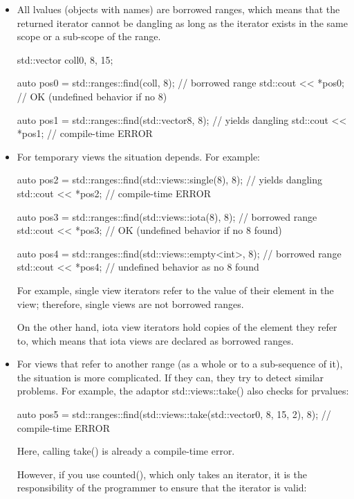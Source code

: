 \begin{itemize}
\item
All lvalues (objects with names) are borrowed ranges, which means that the returned iterator cannot be dangling as long as the iterator exists in the same scope or a sub-scope of the range.

\begin{cpp}
std::vector coll{0, 8, 15};

auto pos0 = std::ranges::find(coll, 8); // borrowed range
std::cout << *pos0; // OK (undefined behavior if no 8)

auto pos1 = std::ranges::find(std::vector{8}, 8); // yields dangling
std::cout << *pos1; // compile-time ERROR
\end{cpp}

\item
For temporary views the situation depends. For example:

\begin{cpp}
auto pos2 = std::ranges::find(std::views::single(8), 8); // yields dangling
std::cout << *pos2; // compile-time ERROR

auto pos3 = std::ranges::find(std::views::iota(8), 8); // borrowed range
std::cout << *pos3; // OK (undefined behavior if no 8 found)

auto pos4 = std::ranges::find(std::views::empty<int>, 8); // borrowed range
std::cout << *pos4; // undefined behavior as no 8 found
\end{cpp}

For example, single view iterators refer to the value of their element in the view; therefore, single views are not borrowed ranges.

On the other hand, iota view iterators hold copies of the element they refer to, which means that iota views are declared as borrowed ranges.

\item
For views that refer to another range (as a whole or to a sub-sequence of it), the situation is more complicated. If they can, they try to detect similar problems. For example, the adaptor std::views::take() also checks for prvalues:

\begin{cpp}
auto pos5 = std::ranges::find(std::views::take(std::vector{0, 8, 15}, 2), 8);
// compile-time ERROR
\end{cpp}

Here, calling take() is already a compile-time error.

However, if you use counted(), which only takes an iterator, it is the responsibility of the programmer to ensure that the iterator is valid:


\end{itemize}
